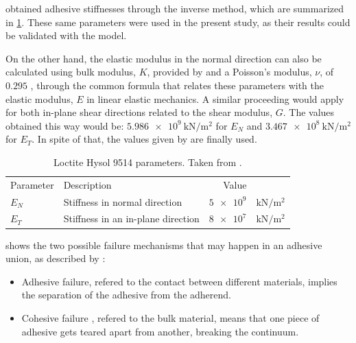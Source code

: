 \documentclass[cmfonts]{witpress}
\begin{document}
\cite{Scattina2011} obtained adhesive stiffnesses through the inverse method, which are summarized in \cref{tab:ads_params}. These same parameters were used in the present study, as their results could be validated with the model.

On the other hand, the elastic modulus in the normal direction can also be calculated using bulk modulus, $K$, provided by \cite{manufCatalog} and a Poisson's modulus, $\nu$, of $\num{0.295}$ \cite{JDiaz}, through the common formula that relates these parameters with the elastic modulus, $E$ in linear elastic mechanics. A similar proceeding would apply for both in-plane shear directions related to the shear modulus, $G$. The values obtained this way would be: $\SI{5.986e9}{\kN/\m^2}$ for $E_{N}$ and $\SI{3.467e8}{\kN/\m^2}$ for $E_{T}$. In spite of that, the values given by \cite{Scattina2011} are finally used.

\begin{table}
	\centering
	\begin{tabular}{llrl}
		Parameter & Description & Value & \\
		
		$E_{N}$ & Stiffness in normal direction & $\num{5e9}$ & $\si{\kN/\m^2}$ \\
		$E_{T}$ & Stiffness in an in-plane direction & $\num{8e7}$ & $\si{\kN/\m^2}$ \\
	\end{tabular}
	\caption[Loctite Hysol 9514 parameters.]{Loctite Hysol 9514 parameters. Taken from \cite{Scattina2011}.}
	\label{tab:ads_params}
\end{table}


 shows the two possible failure mechanisms that may happen in an adhesive union, as described by \cite{Wu2013}:
\begin{itemize}
	\item Adhesive failure, refered to the contact between different materials, implies the separation of the adhesive from the adherend.

	\item Cohesive failure \cite{Vaidya2006}, refered to the bulk material, means that one piece of adhesive gets teared apart from another, breaking the continuum.
\end{itemize}
\end{document}
